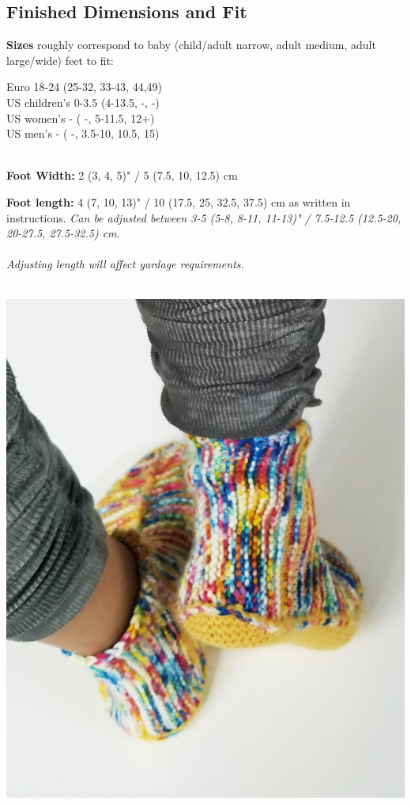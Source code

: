 \documentclass[12pt]{article}
\newcommand{\rowDir}[1]{\textbf{#1:}} %
\newenvironment{unframed}
    {%
	\begin{addmargin}[2em]{0pt}
	\setlength{\parindent}{-2em}}
    {%
	\setlength{\parindent}{0em}
	\end{addmargin}}
\begin{document}
\begin{titlingpage}
\begin{multicols}{2}
\subsection*{Finished Dimensions and Fit}

\textbf{Sizes} roughly correspond to baby (child/adult narrow, adult medium, adult large/wide) feet to fit:

\begin{unframed}
Euro 18-24 (25-32, 33-43, 44,49) \\
US children's 0-3.5 (4-13.5, -, -) \\
US women's - ( -, 5-11.5, 12+) \\
US men's - ( -, 3.5-10, 10.5, 15)
\end{unframed}

~\\
\rowDir{Foot Width} 2 (3, 4, 5)" / 5 (7.5, 10, 12.5) cm

\rowDir{Foot length} 4 (7, 10, 13)" / 10 (17.5, 25, 32.5, 37.5) cm as written in instructions. \emph{Can be adjusted between 3-5 (5-8, 8-11, 11-13)" / 7.5-12.5 (12.5-20, 20-27.5, 27.5-32.5) cm. \\~\\ Adjusting length will affect yardage requirements.}

~\\
\includegraphics[width=\linewidth]{./photos/smallVersions/yellow_backs_200dpi.jpg}


\end{multicols}
\end{titlingpage}
\end{document}
